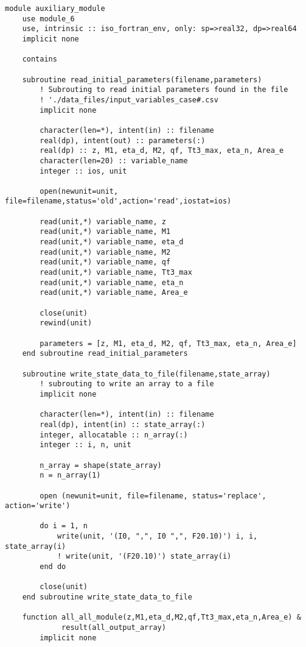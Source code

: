 \begin{verbatim}
module auxiliary_module
    use module_6
    use, intrinsic :: iso_fortran_env, only: sp=>real32, dp=>real64
    implicit none

    contains

    subroutine read_initial_parameters(filename,parameters)
        ! Subrouting to read initial parameters found in the file
        ! './data_files/input_variables_case#.csv
        implicit none
    
        character(len=*), intent(in) :: filename
        real(dp), intent(out) :: parameters(:)
        real(dp) :: z, M1, eta_d, M2, qf, Tt3_max, eta_n, Area_e
        character(len=20) :: variable_name
        integer :: ios, unit
    
        open(newunit=unit, file=filename,status='old',action='read',iostat=ios)
    
        read(unit,*) variable_name, z
        read(unit,*) variable_name, M1
        read(unit,*) variable_name, eta_d
        read(unit,*) variable_name, M2
        read(unit,*) variable_name, qf
        read(unit,*) variable_name, Tt3_max
        read(unit,*) variable_name, eta_n
        read(unit,*) variable_name, Area_e

        close(unit)
        rewind(unit)
    
        parameters = [z, M1, eta_d, M2, qf, Tt3_max, eta_n, Area_e]
    end subroutine read_initial_parameters

    subroutine write_state_data_to_file(filename,state_array)
        ! subrouting to write an array to a file
        implicit none

        character(len=*), intent(in) :: filename
        real(dp), intent(in) :: state_array(:)
        integer, allocatable :: n_array(:)
        integer :: i, n, unit

        n_array = shape(state_array)
        n = n_array(1)

        open (newunit=unit, file=filename, status='replace', action='write')

        do i = 1, n
            write(unit, '(I0, ",", I0 ",", F20.10)') i, i, state_array(i)
            ! write(unit, '(F20.10)') state_array(i)
        end do

        close(unit)
    end subroutine write_state_data_to_file

    function all_all_module(z,M1,eta_d,M2,qf,Tt3_max,eta_n,Area_e) &
             result(all_output_array)
        implicit none


\end{verbatim}
